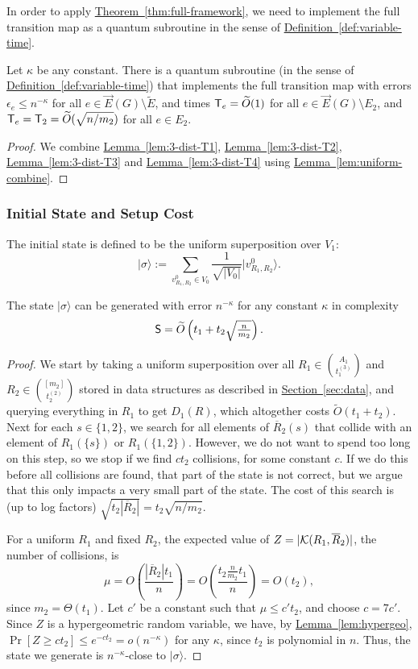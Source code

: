 \documentclass{article}
\renewcommand{\sec}[1]{\hyperref[sec:#1]{Section~\ref*{sec:#1}}}
\newcommand{\thm}[1]{\hyperref[thm:#1]{Theorem~\ref*{thm:#1}}}
\newcommand{\lem}[1]{\hyperref[lem:#1]{Lemma~\ref*{lem:#1}}}
\newcommand{\defin}[1]{\hyperref[def:#1]{Definition~\ref*{def:#1}}}
\def\ket#1{{\lvert}#1\rangle}
\renewcommand{\>}{\rangle}
\newcommand{\<}{\langle}
\renewcommand{\(}{\left(}
\renewcommand{\)}{\right)}
\begin{document}
In order to apply \thm{full-framework}, we need to implement the full transition map as a quantum subroutine in the sense of \defin{variable-time}.
\begin{corollary}\label{cor:3-dist-transitions}
Let $\kappa$ be any constant. 
There is a quantum subroutine (in the sense of \defin{variable-time}) that implements the full transition map with errors $\epsilon_e\leq n^{-\kappa}$ for all $e\in \overrightarrow{E}(G)\setminus\tilde{E}$, and times ${\sf T}_e=\widetilde{O}(1)$ for all $e\in \overrightarrow{E}(G)\setminus E_2$, and ${\sf T}_e={\sf T}_2=\widetilde{O}(\sqrt{n/m_2})$ for all $e\in E_2$. 
\end{corollary}
\begin{proof}
We combine \lem{3-dist-T1}, \lem{3-dist-T2}, \lem{3-dist-T3} and \lem{3-dist-T4} using  \lem{uniform-combine}.
\end{proof}

\subsubsection{Initial State and Setup Cost}


The initial state is defined to be the uniform superposition over $V_1$: 
\begin{equation*}
\ket{\sigma} := \sum_{v^0_{R_1,R_2}\in V_0}\frac{1}{\sqrt{|V_0|}}\ket{v^0_{R_1,R_2}}.
\end{equation*}

\begin{lemma}\label{lem:setup}
The state $\ket{\sigma}$ can be generated with error $n^{-\kappa}$ for any constant $\kappa$ in complexity 
$$\textstyle{\sf S}=\widetilde{O}\left(t_1+t_2\sqrt{\frac{n}{m_2}}\right).$$
\end{lemma}
\begin{proof}
We start by taking a uniform superposition over all $R_1\in \binom{A_1}{t_1^{(3)}}$ and $R_2\in \binom{[m_2]}{t_2^{(2)}}$ stored in data structures as described in \sec{data}, and querying everything in $R_1$ to get $D_1(R)$, which altogether costs $\widetilde{O}(t_1+t_2)$. Next for each $s\in\{1,2\}$, we search for all elements of $\overline{R}_2(s)$ that collide with an element of $R_1(\{s\})$ or $R_1(\{1,2\})$. However, we do not want to spend too long on this step, so we stop if we find $ct_2$ collisions, for some constant $c$. If we do this before all collisions are found, that part of the state is not correct, but we argue that this only impacts a very small part of the state. The cost of this search is (up to log factors) $\sqrt{t_2|\overline{R}_2|}=t_2\sqrt{n/m_2}$. 

For a uniform $R_1$ and fixed $R_2$, the expected value of $Z=|{\cal K}({R}_1,\overline{R}_2)|$, the number of collisions, is 
$$\mu=O\left(\frac{|\overline{R}_2| t_1}{n}\right) = O\left(\frac{t_2\frac{n}{m_2}  t_1}{n}\right)=O(t_2),$$
since $m_2=\Theta(t_1)$. Let $c'$ be a constant such that $\mu\leq c't_2$, and choose $c=7c'$.
Since $Z$ is a hypergeometric random variable, we have, by \lem{hypergeo}, 
$\Pr[Z\geq ct_2] \leq e^{-ct_2} = o( n^{-\kappa})$
for any $\kappa$, since $t_2$ is polynomial in $n$. Thus, the state we generate is $n^{-\kappa}$-close to $\ket{\sigma}$. 
\end{proof}
\end{document}
